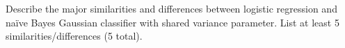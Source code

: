 Describe the major similarities and differences between logistic regression and naïve Bayes Gaussian classifier with shared variance parameter. List at least 5 similarities/differences (5 total).
